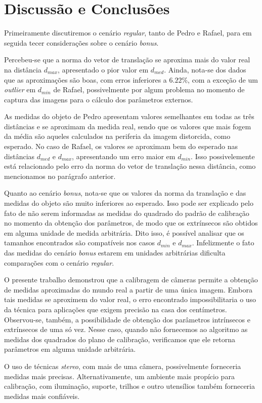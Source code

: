 \documentclass{bmvc2k}
\begin{document}
\section{Discussão e Conclusões}
\label{sec:disc}
Primeiramente discutiremos o cenário \textit{regular}, tanto de Pedro e Rafael, para em seguida tecer considerações sobre o cenário \textit{bonus}.

Percebeu-se que a norma do vetor de translação se aproxima mais
do valor real na distância $d_{max}$, apresentado o pior valor em $d_{med}$. Ainda, nota-se dos dados que as aproximações são boas, com erros inferiores a $6.22\%$, com a exceção de um \textit{outlier} em $d_{min}$ de Rafael, possivelmente por algum problema no momento de captura das imagens para o cálculo dos parâmetros externos.

As medidas do objeto de Pedro apresentam valores semelhantes em todas as três distâncias e se aproximam da medida real, sendo que os valores que mais fogem da média são aqueles calculados na periferia da imagem distorcida, como esperado. No caso de Rafael, os valores se aproximam bem do esperado nas distâncias $d_{med}$ e $d_{max}$, apresentando um erro maior em $d_{min}$. Isso possivelemente está relacionado pelo erro da norma do vetor de translação nessa distância, como mencionamos no parágrafo anterior.

Quanto ao cenário \textit{bonus}, nota-se que os valores da norma da translação e das medidas do objeto são muito inferiores ao esperado. Isso pode ser explicado pelo fato de não serem informadas as medidas do quadrado do padrão de calibração no momento da obtenção dos parâmetros, de modo que os extrínsecos são obtidos em alguma unidade de medida arbitrária. Dito isso, é possível analisar que os tamanhos encontrados são compatíveis nos casos $d_{min}$ e $d_{max}$. Infelizmente o fato das medidas do cenário \textit{bonus} estarem em unidades arbitrárias dificulta comparações com o cenário \textit{regular}.

O presente trabalho demonstrou que a calibragem de câmeras permite a obtenção de medidas aproximadas do mundo real a partir de uma única imagem. Embora tais medidas se aproximem do valor real, o erro encontrado impossibilitaria o uso da técnica para aplicações que exigem precisão na casa dos centímetros. Observou-se, também, a possibilidade de obtenção dos parâmetros intrínsecos e extrínsecos de uma só vez. Nesse caso, quando não fornecemos ao algoritmo as medidas dos quadrados do plano de calibração, verificamos que ele retorna parâmetros em alguma unidade arbitrária. 

O uso de técnicas \textit{stereo}, com mais de uma câmera, possivelmente forneceria medidas mais precisas. Alternativamente, um ambiente mais propício para calibração, com iluminação, suporte, trilhos e outro utensílios também forneceria medidas mais confiáveis.



\clearpage

\end{document}
